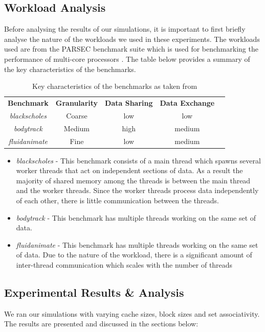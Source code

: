 \documentclass[nonacm,acmsmall,screen,11pt]{acmart}
\begin{document}
\subsection{Workload Analysis}
Before analysing the results of our simulations, it is important to first briefly analyse the nature of the workloads we used in these experiments. The workloads used are from the PARSEC benchmark suite which is used for benchmarking the performance of multi-core processors \cite{bienia2008parsec}. The table below provides a summary of the key characteristics of the benchmarks.
\begin{table}[!htb]
    \centering
    \label{tab:benchmarks}
    \begin{tabular}{|c|c|c|c|l}
        \cline{1-4}
        \multicolumn{1}{|l|}{\textbf{Benchmark}} & \multicolumn{1}{l|}{\textbf{Granularity}} & \multicolumn{1}{l|}{\textbf{Data Sharing}} & \multicolumn{1}{l|}{\textbf{Data Exchange}} &  \\ \cline{1-4}
        \textit{blackscholes} & Coarse & low & low &  \\ \cline{1-4}
        \textit{bodytrack} & Medium & high & medium &  \\ \cline{1-4}
        \textit{fluidanimate} & Fine & low & medium &  \\ \cline{1-4}
    \end{tabular}
    \caption{Key characteristics of the benchmarks as taken from\cite{bienia2008parsec}}
\end{table}
\begin{itemize}
    \item \textit{blackscholes} - This benchmark consists of a main thread which spawns several worker threads that act on independent sections of data. As a result the majority of shared memory among the threads is between the main thread and the worker threads. Since the worker threads process data independently of each other, there is little communication between the threads.
    \item \textit{bodytrack} - This benchmark has multiple threads working on the same set of data. 
    \item \textit{fluidanimate} - This benchmark has multiple threads working on the same set of data. Due to the nature of the workload, there is a significant amount of inter-thread communication which scales with the number of threads \cite{bienia2008parsec}
\end{itemize}

\subsection{Experimental Results \& Analysis}
We ran our simulations with varying cache sizes, block sizes and set associativity. The results are presented and discussed in the sections below:
\end{document}

